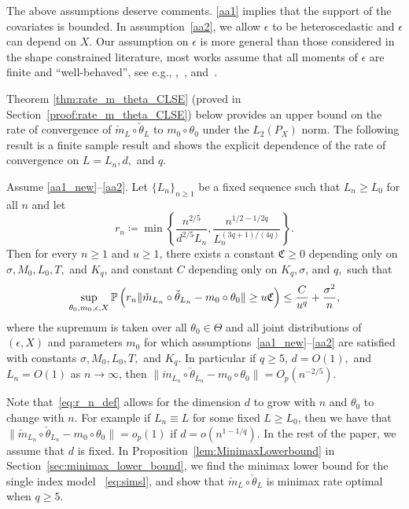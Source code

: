 The above assumptions deserve comments. \ref{aa1} implies that the support of the covariates is bounded. 
In assumption~\ref{aa2}, we allow $\epsilon$ to be heteroscedastic and $\epsilon$ can depend on $X$. Our assumption on $\epsilon$ is more general than those considered in  the shape constrained literature, most works assume that all moments of $\epsilon$ are finite and ``well-behaved'', see e.g., \cite{2017arXiv171205593B},~\cite{Hristacheetal01}, and~\cite{Xiaetal02}.

Theorem \ref{thm:rate_m_theta_CLSE} (proved in Section~\ref{proof:rate_m_theta_CLSE}) below  provides an upper bound on the rate of convergence of $\check{m}_L\circ\check{\theta}_L$ to $m_0\circ\theta_0$ under the $L_2(P_X)$ norm. The following result is a finite sample result and shows the explicit dependence of the rate of convergence on $L = L_n, d,$ and $q$.

\begin{thm}\label{thm:rate_m_theta_CLSE}
Assume \ref{aa1_new}--\ref{aa2}. Let $\{L_n\}_{n\ge 1}$ be a fixed sequence such that $L_n\ge L_0$ for all $n$ and let 
\begin{equation}\label{eq:r_n_def}
r_n\coloneqq\min \left\{  \frac{n^{2/5}}{d^{2/5}L_n},  \frac{n^{1/2-1/2q}}{L_n^{(3q+ 1)/(4q)}} \right\}.
\end{equation}
 Then for every $n\ge 1$ and $u\ge 1$, there exists a constant $\mathfrak{C}\ge 0$ depending only on $\sigma, M_0, L_0, T,$ and  $K_q$, and constant $C$ depending only on $K_q, \sigma$, and $q,$ such that
  \[ \sup_{\theta_0, m_0,\epsilon, X} \mathbb{P}\left( r_n \|\check{m}_{L_n}\circ\check{\theta}_{L_n} - m_0\circ\theta_0\| \ge u \mathfrak{C}\right) \le \frac{C}{u^{q}}+ \frac{\sigma^2}{n},\]
where the supremum is taken over all $\theta_0\in \Theta$ and all joint distributions of $(\epsilon,X)$ and parameters $m_0$ for which assumptions~\ref{aa1_new}--\ref{aa2} are satisfied with constants $\sigma, M_0, L_0, T,$ and  $K_q$. In particular if $q\ge 5$, $d = O(1),$ and $L_n = O(1)$ as $n\to\infty$, then $\|\check{m}_{L_n}\circ\check{\theta}_{L_n} - m_0\circ\theta_0\| = O_p({n^{-2/5}}).$
\end{thm}
Note that~\eqref{eq:r_n_def} allows for the dimension $d$ to grow with $n$ and $\theta_0$ to change with $n$. For example if $L_n\equiv L$ for some fixed $L\ge L_0$, then we have that $\|\check{m}_{L_n}\circ\check{\theta}_{L_n} - m_0\circ\theta_0\| =o_p(1)$  if $d = o(n^{1 - 1/q})$. In  the rest of the paper, we assume that $d$ is fixed.  In Proposition~\ref{lem:MinimaxLowerbound} in Section~\ref{sec:minimax_lower_bound}, we find the minimax lower bound for the single index model ~\eqref{eq:simsl}, and show that $\check{m}_{L}\circ\check{\theta}_L$ is minimax rate optimal when $q\ge 5$.

